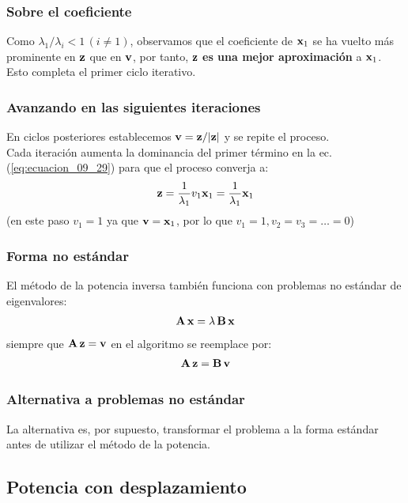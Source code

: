\documentclass[12pt]{beamer}
\begin{document}
\begin{frame}
\frametitle{Sobre el coeficiente}
Como $\lambda_{1} / \lambda_{i} < 1 \, (i \neq 1)$, observamos que el coeficiente de $\vb{x}_{1}$ se ha vuelto más prominente en $\vb{z}$ que en $\vb{v}$, \pause por tanto, $\vb{z}$ \textbf{\textcolor{ao}{es una mejor aproximación}} a $\vb{x}_{1}$. \pause Esto completa el primer ciclo iterativo.
\end{frame}
\begin{frame}
\frametitle{Avanzando en las siguientes iteraciones}
En ciclos posteriores establecemos $\vb{v} = \vb{z}/ \abs{\vb{z}}$ y se repite el proceso.
\\
\bigskip
\pause
Cada iteración aumenta la dominancia del primer término en la ec. (\ref{eq:ecuacion_09_29}) para que el proceso converja a:
\pause
\begin{align*}
\vb{z} = \dfrac{1}{\lambda_{1}} v_{1} \vb{x}_{1} = \dfrac{1}{\lambda_{1}} \vb{x}_{1}
\end{align*}
(en este paso $v_{1} = 1$ ya que $\vb{v} =  \vb{x}_{1}$, por lo que $v_{1} = 1, v_{2} = v_{3} = \ldots = 0$)
\end{frame}
\begin{frame}
\frametitle{Forma no estándar}
El método de la potencia inversa también funciona con problemas no estándar de eigenvalores:
\pause
\begin{align}
\vb{A \, x} = \lambda \, \vb{B \, x}
\label{eq:ecuacion_09_30}
\end{align}
siempre que $\vb{A \, z} = \vb{v}$ en el algoritmo se reemplace por:
\pause
\begin{align}
\vb{A \, z} = \vb{B \, v}
\label{eq:ecuacion_09_31}
\end{align}
\end{frame}
\begin{frame}
\frametitle{Alternativa a problemas no estándar}
La alternativa es, por supuesto, transformar el problema a la forma estándar antes de utilizar el método de la potencia.
\end{frame}

\subsection{Potencia con desplazamiento}
\end{document}

